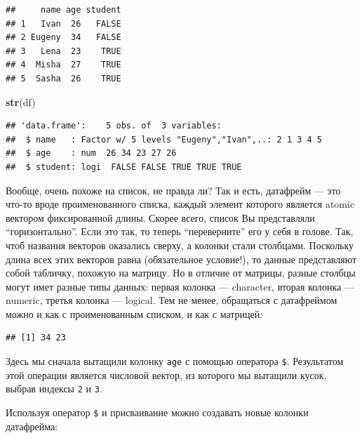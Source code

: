 \documentclass[]{book}
\newenvironment{Shaded}{\begin{snugshade}}{\end{snugshade}}
\newcommand{\DecValTok}[1]{\textcolor[rgb]{0.00,0.00,0.81}{#1}}
\newcommand{\KeywordTok}[1]{\textcolor[rgb]{0.13,0.29,0.53}{\textbf{#1}}}
\newcommand{\NormalTok}[1]{#1}
\newcommand{\OperatorTok}[1]{\textcolor[rgb]{0.81,0.36,0.00}{\textbf{#1}}}
\begin{document}
\begin{verbatim}
##     name age student
## 1   Ivan  26   FALSE
## 2 Eugeny  34   FALSE
## 3   Lena  23    TRUE
## 4  Misha  27    TRUE
## 5  Sasha  26    TRUE
\end{verbatim}

\begin{Shaded}
\begin{Highlighting}[]
\KeywordTok{str}\NormalTok{(df)}
\end{Highlighting}
\end{Shaded}

\begin{verbatim}
## 'data.frame':    5 obs. of  3 variables:
##  $ name   : Factor w/ 5 levels "Eugeny","Ivan",..: 2 1 3 4 5
##  $ age    : num  26 34 23 27 26
##  $ student: logi  FALSE FALSE TRUE TRUE TRUE
\end{verbatim}

Вообще, очень похоже на список, не правда ли? Так и есть, датафрейм --- это что-то вроде проименованного списка, каждый элемент которого является atomic вектором фиксированной длины. Скорее всего, список Вы представляли ``горизонтально''. Если это так, то теперь ``переверните'' его у себя в голове. Так, чтоб названия векторов оказались сверху, а колонки стали столбцами. Поскольку длина всех этих векторов равна (обязательное условие!), то данные представляют собой табличку, похожую на матрицу. Но в отличие от матрицы, разные столбцы могут имет разные типы данных: первая колонка --- character, вторая колонка --- numeric, третья колонка --- logical. Тем не менее, обращаться с датафреймом можно и как с проименованным списком, и как с матрицей:

\begin{Shaded}
\end{Shaded}

\begin{verbatim}
## [1] 34 23
\end{verbatim}

Здесь мы сначала вытащили колонку \texttt{age} с помощью оператора \texttt{\$}. Результатом этой операции является числовой вектор, из которого мы вытащили кусок, выбрав индексы \texttt{2} и \texttt{3}.

Используя оператор \texttt{\$} и присваивание можно создавать новые колонки датафрейма:
\end{document}
